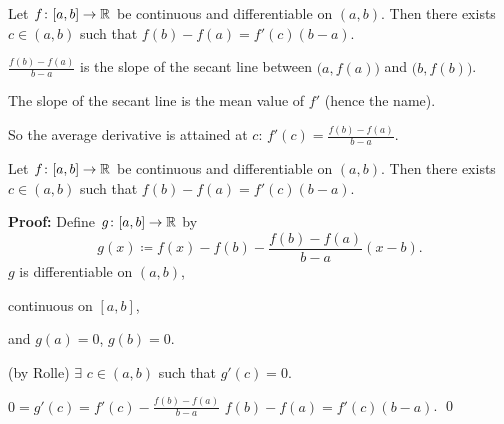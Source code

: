 \documentclass[10pt,aspectratio=169]{beamer}
\begin{document}
\begin{frame}

\begin{theorem}
Let $f \colon [a,b] \to {\mathbb{R}}$ be continuous and
differentiable on $(a,b)$.  Then there exists $c \in (a,b)$
such that \quad
$f(b)-f(a) = f'(c)(b-a)$.
\end{theorem}

\pause
\begin{center}
\end{center}

\pause
$\frac{f(b)-f(a)}{b-a}$
is the slope of the secant line between $\bigl(a,f(a)\bigr)$ and $\bigl(b,f(b)\bigr)$.

\pause
\medskip

The slope of the secant line is the mean value of $f'$ (hence the name).

\pause
\medskip

So the average derivative is attained at $c$:
\quad
$f'(c)=\frac{f(b)-f(a)}{b-a}$.
\end{frame}

\begin{frame}
\begin{theorem}
Let $f \colon [a,b] \to {\mathbb{R}}$ be continuous and
differentiable on $(a,b)$.  Then there exists $c \in (a,b)$
such that \quad
$f(b)-f(a) = f'(c)(b-a)$.
\end{theorem}

\pause
\textbf{Proof:}
Define 
$g \colon [a,b] \to {\mathbb{R}}$ by
\begin{equation*}
g(x) \coloneqq f(x)-f(b)-\frac{f(b)-f(a)}{b-a}(x-b) .
\end{equation*}
\pause
$g$ is differentiable on $(a,b)$,

\pause
continuous on $[a,b]$,

\pause
and $g(a) = 0$, $g(b) = 0$.

\pause
\medskip

\thus \quad (by Rolle) $\exists$
$c \in (a,b)$ such that $g'(c) = 0$.

\pause
\medskip

$0 = g'(c) = f'(c)-\frac{f(b)-f(a)}{b-a}$
\pause
\quad
{}
\quad
$f(b)-f(a) = f'(c)(b-a)$.
\qed

\end{frame}
\end{document}
